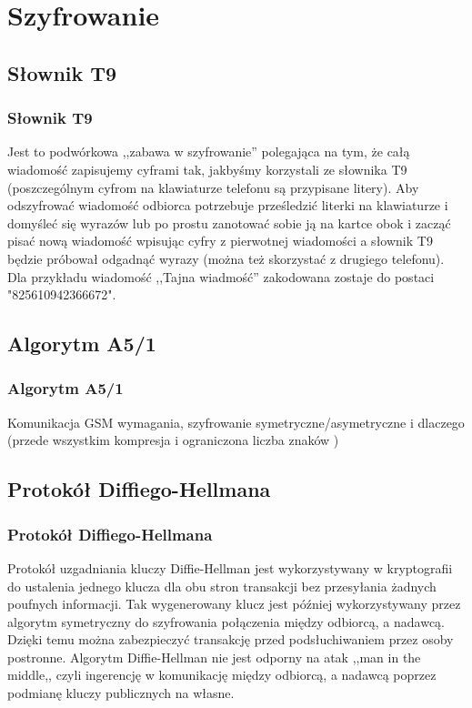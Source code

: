 \documentclass[xcolor=table]{beamer}
\begin{document}
\section{Szyfrowanie}

\subsection{Słownik T9}
\begin{frame}
  \frametitle{Słownik T9}
  Jest to podwórkowa ,,zabawa w szyfrowanie'' polegająca na tym, że całą wiadomość zapisujemy cyframi tak, jakbyśmy korzystali ze słownika T9 (poszczególnym cyfrom na klawiaturze telefonu są przypisane litery). Aby odszyfrować wiadomość odbiorca potrzebuje prześledzić literki na klawiaturze i domyśleć się wyrazów lub po prostu zanotować sobie ją na kartce obok i zacząć pisać nową wiadomość wpisując cyfry z pierwotnej wiadomości a słownik T9 będzie próbował odgadnąć wyrazy (można też skorzystać z drugiego telefonu). \newline
\newline
Dla przykładu wiadomość ,,Tajna wiadmość'' zakodowana zostaje do  postaci "825610942366672".

\end{frame}


\subsection{Algorytm A5/1}

\begin{frame}
  \frametitle{Algorytm A5/1}
 Komunikacja GSM 
 wymagania, szyfrowanie symetryczne/asymetryczne i dlaczego (przede wszystkim kompresja i ograniczona liczba znaków )

\end{frame}


\subsection{Protokół Diffiego-Hellmana}

\begin{frame}
  \frametitle{Protokół Diffiego-Hellmana}
	
Protokół uzgadniania kluczy Diffie-Hellman jest wykorzystywany w kryptografii
do ustalenia jednego klucza dla obu stron transakcji bez przesyłania żadnych 
poufnych informacji. Tak wygenerowany klucz jest później wykorzystywany przez
 algorytm symetryczny do szyfrowania połączenia między odbiorcą, a nadawcą. 
 Dzięki temu można zabezpieczyć transakcję przed podsłuchiwaniem przez osoby 
 postronne. Algorytm Diffie-Hellman nie jest odporny na atak 
 ,,man in the middle,, czyli ingerencję w komunikację między odbiorcą, 
 a nadawcą poprzez podmianę kluczy publicznych na własne.

\end{frame}
\end{document}
